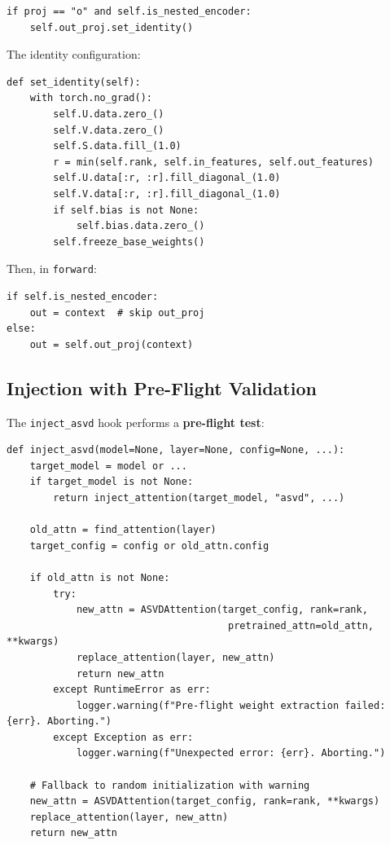 \begin{lstlisting}
if proj == "o" and self.is_nested_encoder:
    self.out_proj.set_identity()
\end{lstlisting}

The identity configuration:

\begin{lstlisting}
def set_identity(self):
    with torch.no_grad():
        self.U.data.zero_()
        self.V.data.zero_()
        self.S.data.fill_(1.0)
        r = min(self.rank, self.in_features, self.out_features)
        self.U.data[:r, :r].fill_diagonal_(1.0)
        self.V.data[:r, :r].fill_diagonal_(1.0)
        if self.bias is not None:
            self.bias.data.zero_()
        self.freeze_base_weights()
\end{lstlisting}

Then, in \texttt{forward}:

\begin{lstlisting}
if self.is_nested_encoder:
    out = context  # skip out_proj
else:
    out = self.out_proj(context)
\end{lstlisting}

\subsection{Injection with Pre-Flight Validation}

The \texttt{inject\_asvd} hook performs a \textbf{pre-flight test}:

\begin{lstlisting}
def inject_asvd(model=None, layer=None, config=None, ...):
    target_model = model or ...
    if target_model is not None:
        return inject_attention(target_model, "asvd", ...)
    
    old_attn = find_attention(layer)
    target_config = config or old_attn.config
    
    if old_attn is not None:
        try:
            new_attn = ASVDAttention(target_config, rank=rank,
                                      pretrained_attn=old_attn, **kwargs)
            replace_attention(layer, new_attn)
            return new_attn
        except RuntimeError as err:
            logger.warning(f"Pre-flight weight extraction failed: {err}. Aborting.")
        except Exception as err:
            logger.warning(f"Unexpected error: {err}. Aborting.")
    
    # Fallback to random initialization with warning
    new_attn = ASVDAttention(target_config, rank=rank, **kwargs)
    replace_attention(layer, new_attn)
    return new_attn
\end{lstlisting}

